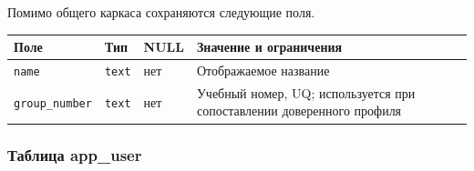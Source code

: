 \documentclass[12pt,a4paper]{article}
\newcounter{none} %
\begin{document}
\hypertarget{таблица-user_group}{}

Помимо общего каркаса сохраняются следующие поля.

{\def\LTcaptype{none} %
\begin{longtable}[]{@{}
  >{\raggedright\arraybackslash}p{}
  >{\raggedright\arraybackslash}p{}
  >{\raggedright\arraybackslash}p{}
  >{\raggedright\arraybackslash}p{}@{}}
\toprule\noalign{}
\begin{minipage}[b]{\linewidth}\raggedright
Поле
\end{minipage} & \begin{minipage}[b]{\linewidth}\raggedright
Тип
\end{minipage} & \begin{minipage}[b]{\linewidth}\raggedright
NULL
\end{minipage} & \begin{minipage}[b]{\linewidth}\raggedright
Значение и ограничения
\end{minipage} \\
\midrule\noalign{}
\endhead
\bottomrule\noalign{}
\endlastfoot
\texttt{name} & \texttt{text} & нет & Отображаемое название \\
\texttt{group\_\allowbreak{}number} & \texttt{text} & нет & Учебный номер, UQ; используется при сопоставлении доверенного профиля \\
\end{longtable}
}

\subsubsection{Таблица app\_user}\label{ux442ux430ux431ux43bux438ux446ux430-app_user}

\hypertarget{таблица-app_user}{}
\end{document}

